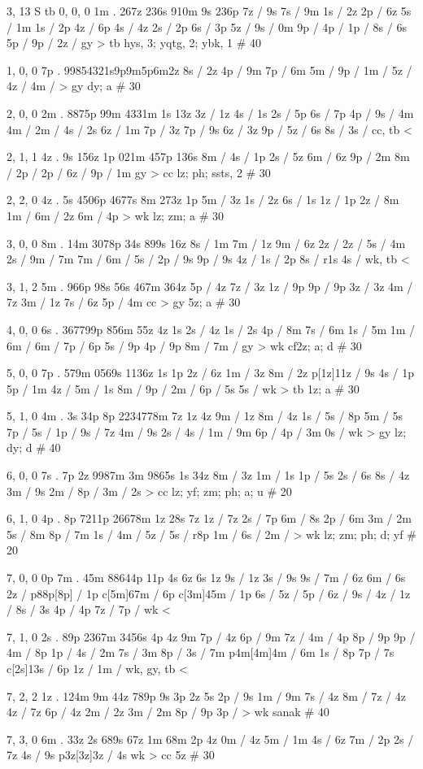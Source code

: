 3, 13
S 
tb 
0, 0, 0
1m . 
267z 236s 910m 9s 236p 
7z / 9s 
7s / 9m 
1s / 2z 
2p / 6z 
5s / 1m 
1s / 2p 
4z / 6p 
4s / 4z 
2s / 2p 
6s / 3p 
5z / 
9s / 0m 
9p / 
4p / 
1p / 
8s / 6s 
5p / 
9p / 
2z / 
gy > tb 
hys, 3; yqtg, 2; ybk, 1 # 40 

1, 0, 0
7p . 
99854321s9p9m5p6m2z
8s / 2z 
4p / 9m 
7p / 6m 
5m / 
9p / 
1m / 
5z / 
4z / 
4m / 
> gy 
dy; a # 30

2, 0, 0
2m . 
8875p 99m 4331m 1s 13z 
3z / 1z 
4s / 1s 
2s / 5p 
6s / 7p 
4p / 
9s / 4m 
4m / 
2m / 
4s / 2s 
6z / 1m 
7p / 3z 
7p / 9s 
6z / 3z 
9p / 
5z / 6s 
8s / 
3s / 
cc, tb <

2, 1, 1 
4z . 9s
156z 1p 021m 457p 136s 
8m /  
4s / 1p 
2s / 5z 
6m / 6z  
9p / 2m 
8m / 
2p / 
2p / 
6z / 
9p / 1m 
gy > cc 
lz; ph; ssts, 2 # 30

2, 2, 0 
4z . 5s
4506p 4677s 8m 273z 1p 
5m / 3z 
1s / 2z 
6s / 1s 
1z / 1p 
2z / 8m 
1m / 
6m / 2z 
6m / 4p 
> wk 
lz; zm; a # 30

3, 0, 0 
8m . 
14m 3078p 34s 899s 16z 
8s / 1m 
7m / 1z 
9m / 6z 
2z / 
2z / 
5s / 4m 
2s / 
9m / 7m 
7m / 
6m / 
5s / 
2p / 9s 
9p / 9s 
4z / 
1s / 2p 
8s / r1s 
4s / 
wk, tb <

3, 1, 2 
5m . %
966p 98s 56s 467m 364z 
5p / 4z 
7z / 3z 
1z / 9p 
9p / 9p 
3z / 3z 
4m / 7z 
3m / 1z 
7s / 6z 
5p / 4m 
cc > gy 
5z; a # 30 


4, 0, 0 
6s . 
367799p 856m 55z 4z 1s 
2s / 4z 
1s / 2s 
4p / 8m 
7s / 6m 
1s / 5m 
1m / 
6m / 
6m / 
7p / 6p 
5s / 9p 
4p / 9p 
8m / 
7m / 
gy > wk 
cf2z; a; d # 30

5, 0, 0
7p . 
579m 0569s 1136z 1s 1p 
2z / 6z 
1m / 3z 
8m / 2z 
p[1z]11z / 9s 
4s / 1p 
5p / 1m 
4z / 
5m / 1s 
8m / 
9p / 
2m / 
6p / 5s 
5s / 
wk > tb 
1z; a # 30

5, 1, 0
4m . 3s
34p 8p 2234778m 7z 1z 4z 
9m / 1z 
8m / 4z 
1s / 
5s / 8p 
5m / 5s 
7p / 
5s / 
1p / 
9s / 7z 
4m / 9s 
2s / 
4s / 
1m / 9m 
6p / 
4p / 3m 
0s / 
wk > gy 
lz; dy; d # 40

6, 0, 0
7s . 7p
2z 9987m 3m 9865s 1s 34z 
8m / 3z 
1m / 1s 
1p / 5s 
2s / 6s 
8s / 4z 
3m / 9s 
2m / 
8p / 
3m / 2s 
> cc 
lz; yf; zm; ph; a; u # 20

6, 1, 0
4p . 8p
7211p 26678m 1z 28s 7z 
1z / 7z 
2s / 7p 
6m / 8s 
2p / 6m 
3m / 2m 
5s / 8m 
8p / 7m 
1s / 
4m / 
5z / 
5s / r8p 
1m / 
6s / 
2m / 
> wk 
lz; zm; ph; d; yf # 20

7, 0, 0
0p 7m . 
45m 88644p 11p 4s 6z 6s 1z 
9s / 1z 
3s / 9s 
9s / 
7m / 6z 
6m / 6s 
2z / 
p88p[8p] / 1p 
c[5m]67m / 6p 
c[3m]45m / 1p 
6s / 
5z / 
5p / 
6z / 
9s / 
4z / 
1z /
8s / 3s 
4p / 4p 
7z / 
7p / 
wk < 

7, 1, 0 
2s .
89p 2367m 3456s 4p 4z 9m 
7p / 4z 
6p / 9m 
7z / 
4m / 4p 
8p / 9p 
9p / 
4m / 8p 
1p / 
4s / 2m 
7s / 3m 
8p / 
3s / 7m 
p4m[4m]4m / 6m 
1s / 8p 
7p / 7s 
c[2s]13s / 6p 
1z / 
1m / 
wk, gy, tb <

7, 2, 2
1z . 
124m 9m 44z 789p 9s 3p 2z 5s 
2p / 9s 
1m / 9m 
7s / 4z 
8m / 
7z / 4z 
4z / 7z 
6p / 4z 
2m / 2z 
3m / 2m 
8p / 9p 
3p / 
> wk 
sanak # 40

7, 3, 0 
6m . 
33z 2s 689s 67z 1m 68m 2p 4z 
0m / 4z 
5m / 1m 
4s / 6z 
7m / 2p 
2s / 7z 
4s / 9s 
p3z[3z]3z / 4s 
wk > cc 
5z # 30
